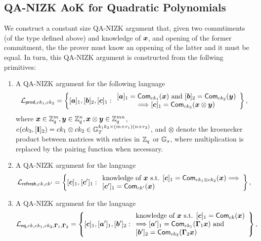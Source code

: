 \subsection{QA-NIZK AoK for Quadratic Polynomials}
We construct a constant size QA-NIZK argument that, given two commtiments  (of the type defined above) and knowledge of ${\boldsymbol{x}}$, and opening of the former commitment, the the prover must know an oppening of the latter and it must be equal.
In turn, this QA-NIZK argument is constructed from the follwing primitives:
\begin{enumerate}
\item A QA-NIZK argument for the following language
$$
\mathcal{L}_{\mathsf{prod},ck_1,ck_2}=\left\{[{\boldsymbol{a}}]_1,[{\boldsymbol{b}}]_2,[{\boldsymbol{c}}]_1:
	\begin{array}{c}
		[{\boldsymbol{a}}]_1=\mathsf{Com}_{ck_1}({\boldsymbol{x}})\text{ and }
		{[{\boldsymbol{b}}]_2=\mathsf{Com}_{ck_2}({\boldsymbol{y}})}\\
		\Longrightarrow
		[{\boldsymbol{c}}]_1=\mathsf{Com}_{ck_3}({\boldsymbol{x}}\otimes{\boldsymbol{y}})
	\end{array}\right\},
$$
where ${\boldsymbol{x}}\in\mathbb{Z}_q^m,{\boldsymbol{y}}\in\mathbb{Z}_q^n,{\boldsymbol{x}}\otimes{\boldsymbol{y}}\in\mathbb{Z}_q^{mn}$, $e(ck_3,[\mathbf{{I}}]_{2})=ck_1\otimes ck_2\allowbreak\in\mathbb{G}_T^{k_1k_2\times(m+r_1)(n+r_2)}$, and $\otimes$ denote the kroenecker product between matrices with entries in $\mathbb{Z}_q$ or $\mathbb{G}_s$, where multiplication is replaced by the pairing function when necessary.
\item A QA-NIZK argument for the language
$$
\mathcal{L}_{\mathsf{refresh},ck,ck'} = \left\{[{\boldsymbol{c}}]_1,[{\boldsymbol{c}}']_1:
	\begin{array}{l} \text{knowledge of } {\boldsymbol{x}} \text{ s.t. }
		{[{\boldsymbol{c}}]_1=\mathsf{Com}_{ck_1\otimes ck_2}({\boldsymbol{x}})}
		\Longrightarrow\\
		{[{\boldsymbol{c}}']_1=\mathsf{Com}_{ck'}({\boldsymbol{x}})}
	\end{array}\right\},
$$
\item A QA-NIZK argument for the language
$$
\mathcal{L}_{\mathsf{eq},ck,ck_1,ck_2,\mathbf{{\Gamma}}_1,\mathbf{{\Gamma}}_2} = \left\{[{\boldsymbol{c}}]_1,[{\boldsymbol{a}}']_1,[{\boldsymbol{b}}']_2:
	\begin{array}{l}
		\text{knowledge of } {\boldsymbol{x}} \text{ s.t. }[{\boldsymbol{c}}]_1=\mathsf{Com}_{ck}({\boldsymbol{x}})\\
		\Longrightarrow
		[{\boldsymbol{a}}']_1=\mathsf{Com}_{ck_1}(\mathbf{{\Gamma}}_1{\boldsymbol{x}})\text{ and }\\
		{[{\boldsymbol{b}}']_2=\mathsf{Com}_{ck_2}(\mathbf{{\Gamma}}_2{\boldsymbol{x}})}
	\end{array}\right\},
$$
\end{enumerate}

